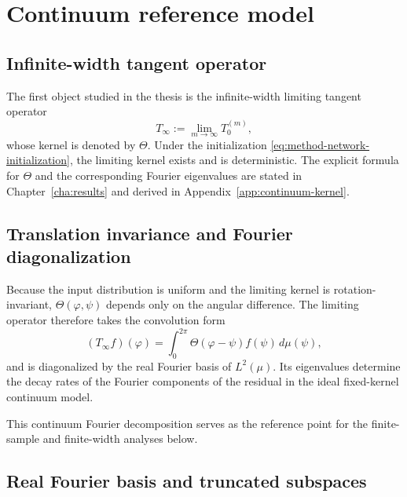 \section{Continuum reference model}

\subsection{Infinite-width tangent operator}

The first object studied in the thesis is the infinite-width limiting tangent operator
\begin{equation}
	T_\infty:=\lim_{m\to\infty} T_0^{(m)},
	\label{eq:method-infinite-width-operator}
\end{equation}
whose kernel is denoted by \(\Theta\). Under the initialization
\eqref{eq:method-network-initialization}, the limiting kernel exists and is deterministic.
The explicit formula for \(\Theta\) and the corresponding Fourier eigenvalues are stated in
Chapter~\ref{cha:results} and derived in Appendix~\ref{app:continuum-kernel}.

\subsection{Translation invariance and Fourier diagonalization}

Because the input distribution is uniform and the limiting kernel is rotation-invariant,
\(\Theta(\varphi,\psi)\) depends only on the angular difference. The limiting operator
therefore takes the convolution form
\begin{equation}
	(T_\infty f)(\varphi)
	=
	\int_0^{2\pi}\Theta(\varphi-\psi)f(\psi)\,d\mu(\psi),
	\label{eq:method-continuum-operator}
\end{equation}
and is diagonalized by the real Fourier basis of \(L^2(\mu)\). Its eigenvalues determine the
decay rates of the Fourier components of the residual in the ideal fixed-kernel continuum
model.

This continuum Fourier decomposition serves as the reference point for the finite-sample and
finite-width analyses below.

\subsection{Real Fourier basis and truncated subspaces}
\label{subsec:real-fourier-basis-truncates-subspaces}

